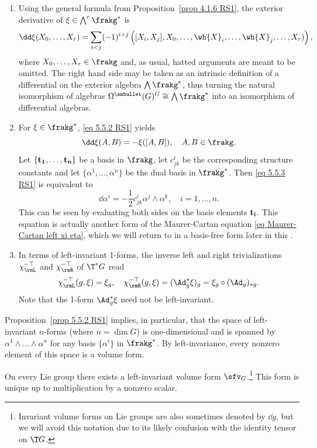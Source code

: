 \begin{rem}
\begin{enumerate}
    \item Using the general formula from Proposition~\ref{prop 4.1.6 RS1}, the exterior derivative of $\xi\in\bigwedge\nolimits^r\frakg^\ast$ is
    \[\dd\xi(X_0,\ldots,X_r)=\sum_{i<j}(-1)^{i+j}\left([X_i,X_j],X_0,\ldots,\wh{X}_i,\ldots,\wh{X}_j,\ldots,X_r)\right),\label{eq 5.5.2 RS1}\]
    where $X_0,\ldots,X_r\in\frakg$ and, as usual, hatted arguments are meant to be omitted. The right hand side may be taken as an intrinsic definition of a differential on the exterior algebra $\bigwedge\frakg^\ast$, thus turning the natural isomorphism of algebras $\Omega^{\smbullet }(G)^G\cong\bigwedge\frakg^\ast$ into an isomorphism of differential algebras.
    \item For $\xi\in\frakg^\ast$, \eqref{eq 5.5.2 RS1} yields
    \[\dd\xi(A,B)=-\xi([A,B]),\quad A,B\in\frakg.\label{eq 5.5.3 RS1}\]
    Let $\{\bf{t}_1,\ldots,\bf{t}_n\}$ be a basis in $\frakg$, let $c^i_{jk}$  be the corresponding structure constants and let $\{\alpha^1,\ldots,\alpha^n\}$ be the dual basis in $\frakg^\ast$. Then \eqref{eq 5.5.3 RS1} is equivalent to
    \[\dd \alpha^i=-\frac 12 c^i_{jk}\alpha^j\wedge \alpha^k,\quad i=1,\ldots,n.\label{eq 5.5.4 RS1 MC in coords}\]
    This can be seen by evaluating both sides on the basis elements $\bf{t}_i$. This equation is actually another form of the Maurer-Cartan equation  \eqref{eq Maurer-Cartan left xi eta}, which we will return to in a basis-free form later in this \sect.
    \item In terms of left-invariant 1-forms, the inverse left and right trivializations $\chi_\rmL^{-\top}$ and $\chi_\rmR^{-\top}$ of $\T^\ast G$ read
    \[\chi_\rmL^{-\top}(g,\xi)=\xi_g,\quad \chi_\rmR^{-\top}(g,\xi)=(\Ad_{g}^\ast \xi)_g=\xi_g\circ (\Ad_g)_{\ast g}.\]
    Note that the 1-form $\Ad_g^\ast\xi$ need not be left-invariant.
\end{enumerate}
\end{rem}

Proposition~\ref{prop 5.5.2 RS1} implies, in particular, that the space of left-invariant $n$-forms (where $n=\dim G$) is one-dimensional and is spanned by $\alpha^1\wedge\ldots\wedge\alpha^n$ for any basis $\{\alpha^i\}$ in $\frakg^\ast$. By left-invariance, every nonzero element of this space is a volume form.

\begin{cor}
    On every Lie group there exists a left-invariant volume form $\sfv_G$.\footnote{Invariant volume forms on Lie groups are also sometimes denoted by $\dd g$, but we will avoid this notation due to its likely confusion with the identity tensor on $\T G$.} This form is unique up to multiplication by a nonzero scalar. 
\end{cor}

